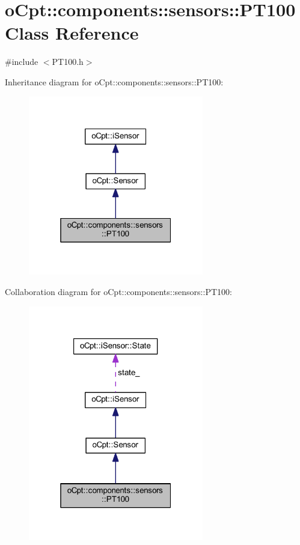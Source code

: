 \hypertarget{classo_cpt_1_1components_1_1sensors_1_1_p_t100}{}\section{o\+Cpt\+:\+:components\+:\+:sensors\+:\+:P\+T100 Class Reference}
\label{classo_cpt_1_1components_1_1sensors_1_1_p_t100}


{\ttfamily \#include $<$P\+T100.\+h$>$}



Inheritance diagram for o\+Cpt\+:\+:components\+:\+:sensors\+:\+:P\+T100\+:\nopagebreak
\begin{figure}[H]
\begin{center}
\leavevmode
\includegraphics[width=217pt]{classo_cpt_1_1components_1_1sensors_1_1_p_t100__inherit__graph}
\end{center}
\end{figure}


Collaboration diagram for o\+Cpt\+:\+:components\+:\+:sensors\+:\+:P\+T100\+:\nopagebreak
\begin{figure}[H]
\begin{center}
\leavevmode
\includegraphics[width=217pt]{classo_cpt_1_1components_1_1sensors_1_1_p_t100__coll__graph}
\end{center}
\end{figure}
